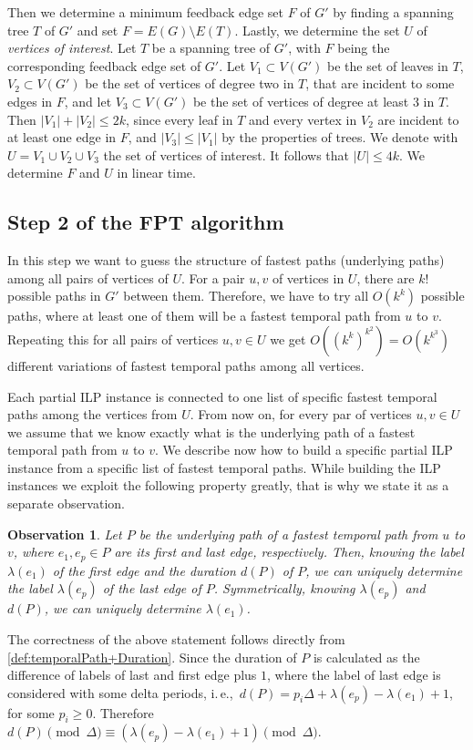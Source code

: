 \documentclass[11pt,a4paper]{article}
\newtheorem{observation}{Observation}
\theoremstyle{remark}
\theoremstyle{definition}
\newcommand{\ie}{i.\,e.,\ }
\begin{document}
Then we determine a minimum feedback edge set $F$ of $G'$ by finding a spanning tree $T$ of $G'$ and set $F = E(G) \setminus E(T)$. 
Lastly, we determine the set $U$ of \emph{vertices of interest}.
Let $T$ be a spanning tree of $G'$, with $F$ being the corresponding feedback edge set of $G'$.
Let $V_1 \subset V(G')$ be the set of leaves in $T$, $V_2 \subset V(G')$ be the set of vertices of degree two in $T$, that are incident to some edges in $F$, and let $V_3 \subset V(G')$ be the set of vertices of degree at least $3$ in $T$. 
Then $|V_1| + |V_2| \leq 2k$, since every leaf in $T$ and every vertex in $V_2$ are incident to at least one edge in $F$,
and $|V_3| \leq |V_1|$ by the properties of trees.
We denote with $U = V_1 \cup V_2 \cup V_3$ the set of vertices of interest. It follows that $|U| \leq 4k$.
We determine $F$ and $U$ in linear time.

\subsection{Step 2 of the FPT algorithm}
In this step we want to guess the structure of fastest paths (underlying paths) among all pairs of vertices of $U$. %
For a pair $u,v$ of vertices in $U$, there are $k!$ possible paths in $G'$ between them. 
Therefore, we have to try all $O(k^k)$ possible paths, where at least one of them will be a fastest temporal path from $u$ to $v$.
Repeating this for all pairs of vertices $u,v \in U$ we get $O((k^k)^{k^2})=O(k^{k^3})$ different variations of fastest temporal paths among all vertices.

Each partial ILP instance is connected to one list of specific fastest temporal paths among the vertices from $U$.
From now on, for every par of vertices $u,v \in U$ we assume that we know exactly what is the underlying path of a fastest temporal path from $u$ to $v$.
We describe now how to build a specific partial ILP instance from a specific list of fastest temporal paths.
While building the ILP instances we exploit the following property greatly, that is why we state it as a separate observation.

\begin{observation}\label{obs:FirstLabelAndDuration}
    Let $P$ be the underlying path of a fastest temporal path from $u$ to $v$, where $e_1, e_p \in P$ are its first and last edge, respectively.
    Then, knowing the label $\lambda (e_1)$ of the first edge and the duration $d(P)$ of $P$, we can uniquely determine the label $\lambda (e_p)$ of the last edge of $P$.
    Symmetrically, knowing $\lambda(e_p)$ and $d(P)$, we can uniquely determine $\lambda(e_1)$.
\end{observation}
The correctness of the above statement follows directly from \cref{def:temporalPath+Duration}. Since the duration of $P$ is calculated as the difference of labels of last and first edge plus $1$,
where the label of last edge is considered with some delta periods,
\ie $d(P) = p_i \Delta + \lambda(e_p) - \lambda (e_1) + 1$, for some $p_i \geq 0$.
Therefore $d(P) \pmod \Delta \equiv  (\lambda(e_p) - \lambda (e_1) + 1) \pmod \Delta$.
\end{document}
